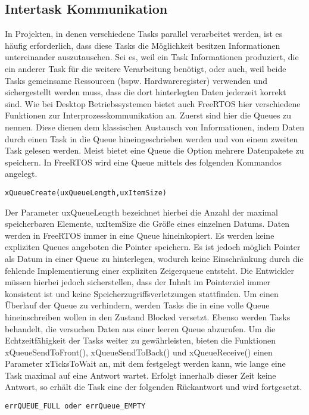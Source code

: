\subsection{Intertask Kommunikation}
In Projekten, in denen verschiedene Tasks parallel verarbeitet werden, ist es häufig erforderlich, dass diese Tasks die Möglichkeit besitzen Informationen untereinander auszutauschen. Sei es, weil ein Task Informationen produziert, die ein anderer Task für die weitere Verarbeitung benötigt, oder auch, weil beide Tasks gemeinsame Ressourcen (bspw. Hardwareregister) verwenden und sichergestellt werden muss, dass die dort hinterlegten Daten jederzeit korrekt sind. Wie bei Desktop Betriebssystemen bietet auch FreeRTOS hier verschiedene Funktionen zur Interprozesskommunikation an. Zuerst sind hier die Queues zu nennen. Diese dienen dem klassischen Austausch von Informationen, indem Daten durch einen Task in die Queue hineingeschrieben werden und von einem zweiten Task gelesen werden. Meist bietet eine Queue die Option mehrere Datenpakete zu speichern. In FreeRTOS wird eine Queue mittels des folgenden Kommandos angelegt. 
\begin{lstlisting}[numbers = none]
xQueueCreate(uxQueueLength,uxItemSize)
\end{lstlisting}
Der Parameter uxQueueLength bezeichnet hierbei die Anzahl der maximal speicherbaren Elemente, uxItemSize die Größe eines einzelnen Datums. Daten werden in FreeRTOS immer in eine Queue hineinkopiert. 
Es werden keine expliziten Queues angeboten die Pointer speichern. Es ist jedoch möglich Pointer als Datum in einer Queue zu hinterlegen, wodurch keine Einschränkung durch die fehlende Implementierung einer expliziten Zeigerqueue entsteht. Die Entwickler müssen hierbei jedoch sicherstellen, dass der Inhalt im Pointerziel immer konsistent ist und keine Speicherzugriffsverletzungen stattfinden.
Um einen Überlauf der Queue zu verhindern, werden Tasks die in eine volle Queue hineinschreiben wollen in den Zustand Blocked versetzt. Ebenso werden Tasks behandelt, die versuchen Daten aus einer leeren Queue abzurufen. Um die Echtzeitfähigkeit der Tasks weiter zu gewährleisten, bieten die Funktionen xQueueSendToFront(), xQueueSendToBack() und xQueueReceive() einen Parameter xTicksToWait an, mit dem festgelegt werden kann, wie lange eine Task maximal auf eine Antwort wartet. Erfolgt innerhalb dieser Zeit keine Antwort, so erhält die Task eine der folgenden Rückantwort und wird fortgesetzt. 
\begin{lstlisting}[numbers = none]
errQUEUE_FULL oder errQueue_EMPTY
\end{lstlisting}

